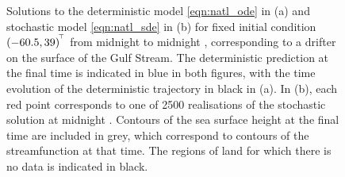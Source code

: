 \begin{figure}
\begin{center}
\begin{subfigure}[t]{0.49\textwidth}
			\label{fig:natl_stoch_rels}
		\end{subfigure}
		\caption{Solutions to the deterministic model \cref{eqn:natl_ode} in (a) and stochastic model \cref{eqn:natl_sde} in (b) for fixed initial condition \((-60.5, 39)^{^{\!\top}}\) from midnight  to midnight , corresponding to a drifter on the surface of the Gulf Stream.
			The deterministic prediction at the final time is indicated in blue in both figures, with the time evolution of the deterministic trajectory in black in (a).
			In (b), each red point corresponds to one of 2500 realisations of the stochastic solution at midnight .
			Contours of the sea surface height at the final time are included in grey, which correspond to contours of the streamfunction at that time.
			The regions of land for which there is no data is indicated in black.}
	\end{center}
\end{figure}

